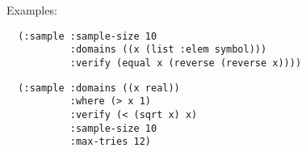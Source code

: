 Examples:
\begin{verbatim}
  (:sample :sample-size 10
           :domains ((x (list :elem symbol)))
           :verify (equal x (reverse (reverse x))))
\end{verbatim}

\begin{verbatim}
  (:sample :domains ((x real))
           :where (> x 1)
           :verify (< (sqrt x) x)
           :sample-size 10
           :max-tries 12)
\end{verbatim}

\begin{verbatim}

\end{verbatim}

